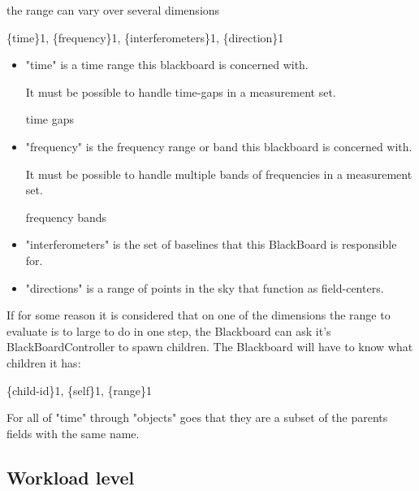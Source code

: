 \documentclass[]{lofar}
\begin{document}
      the range can vary over several dimensions

      \{time\}1, \{frequency\}1, \{interferometers\}1, \{direction\}1

      \begin{itemize}

	\item 

          "time" is a time range this blackboard is concerned with.
          \begin{requirement}
            It must be possible to handle time-gaps in a measurement set.
            \caption{time gaps\label{req:time-gaps}}
          \end{requirement}

	\item 

          "frequency" is the frequency range or band this blackboard
          is concerned with.

          \begin{requirement}
            It must be possible to handle multiple bands of frequencies in a
            measurement set.
            \caption{frequency bands\label{req:frequency-bands}}
          \end{requirement}

	\item 

          "interferometers" is the set of baselines that this
          BlackBoard is responsible for.

	\item 

          "directions" is a range of points in the sky that function
          as field-centers.

      \end{itemize}

      If for some reason it is considered that on one of the
      dimensions the range to evaluate is to large to do in one step,
      the Blackboard can ask it's BlackBoardController to spawn
      children. The Blackboard will have to know what children it has:

      \{child-id\}1, \{self\}1, \{range\}1

      For all of "time" through "objects" goes that they are a subset
      of the parents fields with the same name.

    \subsection{Workload level}
    \label{subsec:workload-level}\hypertarget{subsec:workload-level}{}%
\end{document}
